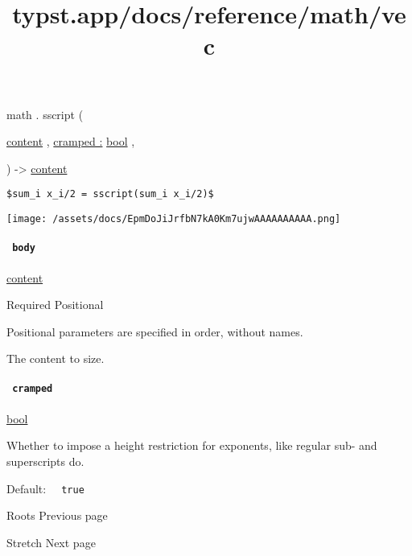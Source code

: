 math { . } { sscript } (

{ \href{/docs/reference/foundations/content/}{content} , } {
\hyperref[functions-sscript-parameters-cramped]{cramped :}
\href{/docs/reference/foundations/bool/}{bool} , }

) -\textgreater{} \href{/docs/reference/foundations/content/}{content}

\begin{verbatim}
$sum_i x_i/2 = sscript(sum_i x_i/2)$
\end{verbatim}

\texttt{[image: /assets/docs/EpmDoJiJrfbN7kA0Km7ujwAAAAAAAAAA.png]}

\paragraph{\texorpdfstring{\texttt{\ body\ }}{ body }}\label{functions-sscript-body}

\href{/docs/reference/foundations/content/}{content}

{Required} {{ Positional }}

\label{functions-sscript-body-positional-tooltip}
Positional parameters are specified in order, without names.

The content to size.

\paragraph{\texorpdfstring{\texttt{\ cramped\ }}{ cramped }}\label{functions-sscript-cramped}

\href{/docs/reference/foundations/bool/}{bool}

Whether to impose a height restriction for exponents, like regular sub-
and superscripts do.

Default: \texttt{\ }{\texttt{\ true\ }}\texttt{\ }

\href{/docs/reference/math/roots/}{\pandocbounded{}}

{ Roots } { Previous page }

\href{/docs/reference/math/stretch/}{\pandocbounded{}}

{ Stretch } { Next page }


\title{typst.app/docs/reference/math/vec}

